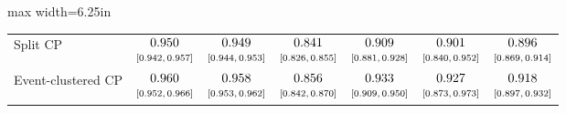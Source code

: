 \begin{table}[htbp]
\begin{adjustbox}{max width=6.25in}
\begin{tabular}{lcccccc}
Split CP & $\begin{array}{@{}c@{}}0.950\\[-1pt] \scriptstyle[0.942,\,0.957]\end{array}$ & $\begin{array}{@{}c@{}}0.949\\[-1pt] \scriptstyle[0.944,\,0.953]\end{array}$ & $\begin{array}{@{}c@{}}0.841\\[-1pt] \scriptstyle[0.826,\,0.855]\end{array}$ & $\begin{array}{@{}c@{}}0.909\\[-1pt] \scriptstyle[0.881,\,0.928]\end{array}$ & $\begin{array}{@{}c@{}}0.901\\[-1pt] \scriptstyle[0.840,\,0.952]\end{array}$ & $\begin{array}{@{}c@{}}0.896\\[-1pt] \scriptstyle[0.869,\,0.914]\end{array}$ \\
Event-clustered CP & $\begin{array}{@{}c@{}}0.960\\[-1pt] \scriptstyle[0.952,\,0.966]\end{array}$ & $\begin{array}{@{}c@{}}0.958\\[-1pt] \scriptstyle[0.953,\,0.962]\end{array}$ & $\begin{array}{@{}c@{}}0.856\\[-1pt] \scriptstyle[0.842,\,0.870]\end{array}$ & $\begin{array}{@{}c@{}}0.933\\[-1pt] \scriptstyle[0.909,\,0.950]\end{array}$ & $\begin{array}{@{}c@{}}0.927\\[-1pt] \scriptstyle[0.873,\,0.973]\end{array}$ & $\begin{array}{@{}c@{}}0.918\\[-1pt] \scriptstyle[0.897,\,0.932]\end{array}$ \\

\end{tabular}
\end{adjustbox}
\end{table}
